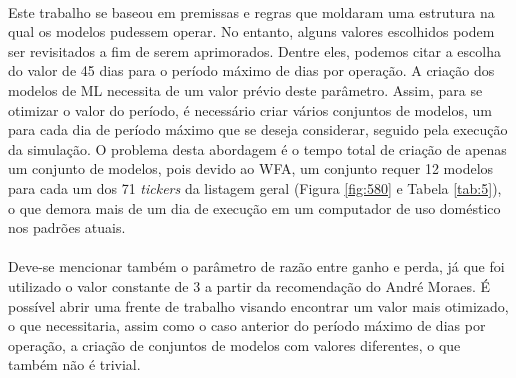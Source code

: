 \paragraph{} Este trabalho se baseou em premissas e regras que moldaram uma estrutura na qual os modelos pudessem operar. No entanto, alguns valores escolhidos podem ser revisitados a fim de serem aprimorados. Dentre eles, podemos citar a escolha do valor de 45 dias para o período máximo de dias por operação. A criação dos modelos de ML necessita de um valor prévio deste parâmetro. Assim, para se otimizar o valor do período, é necessário criar vários conjuntos de modelos, um para cada dia de período máximo que se deseja considerar, seguido pela execução da simulação. O problema desta abordagem é o tempo total de criação de apenas um conjunto de modelos, pois devido ao WFA, um conjunto requer 12 modelos para cada um dos 71 \textit{tickers} da listagem geral (Figura \ref{fig:580} e Tabela \ref{tab:5}), o que demora mais de um dia de execução em um computador de uso doméstico nos padrões atuais.

\paragraph{} Deve-se mencionar também o parâmetro de razão entre ganho e perda, já que foi utilizado o valor constante de 3 a partir da recomendação do André Moraes. É possível abrir uma frente de trabalho visando encontrar um valor mais otimizado, o que necessitaria, assim como o caso anterior do período máximo de dias por operação, a criação de conjuntos de modelos com valores diferentes, o que também não é trivial.

